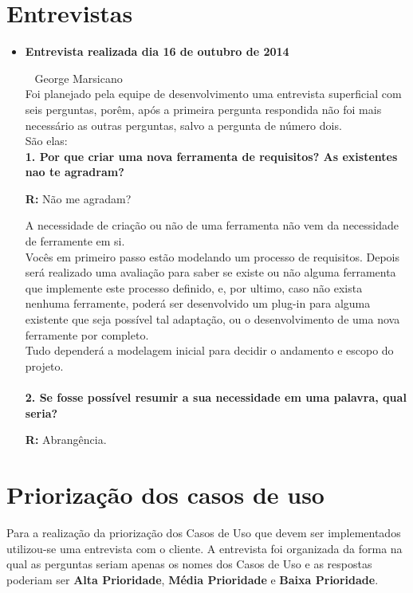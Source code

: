 
\appendix
\chapter{Entrevistas}
	\begin{itemize}
		\item \textbf{Entrevista realizada dia 16 de outubro de 2014}

			\cliente~ George Marsicano\\
			Foi planejado pela equipe de desenvolvimento uma entrevista superficial com seis perguntas, porêm, após a primeira pergunta respondida não foi mais necessário as outras perguntas, salvo a pergunta de número dois.\\
			São elas:\\
			

			\textbf{1. Por que criar uma nova ferramenta de requisitos? As existentes nao te agradram?}
		
			\textbf{R:} Não me agradam?

			A necessidade de criação ou não de uma ferramenta não vem da necessidade de ferramente em si.
			\\
			Vocês em primeiro passo estão modelando um processo de requisitos. Depois será realizado uma avaliação para saber se existe ou não alguma ferramenta que implemente este processo definido, e, por ultimo, caso não exista nenhuma ferramente, poderá ser desenvolvido um plug-in para alguma existente que seja possível tal adaptação, ou o desenvolvimento de uma nova ferramente por completo.
			\\
			Tudo dependerá a modelagem inicial para decidir o andamento e escopo do projeto.
			\\
			\\
			\textbf{2. Se fosse possível resumir a sua necessidade em uma palavra, qual seria?}

			\textbf{R:} Abrangência.
	\end{itemize}

\chapter{Priorização dos casos de uso}

Para a realização da priorização dos Casos de Uso que devem ser implementados utilizou-se uma entrevista com o cliente. A entrevista foi organizada da forma na qual as perguntas seriam apenas os nomes dos Casos de Uso e as respostas poderiam ser \textbf{Alta Prioridade}, \textbf{Média Prioridade} e \textbf{Baixa Prioridade}.

